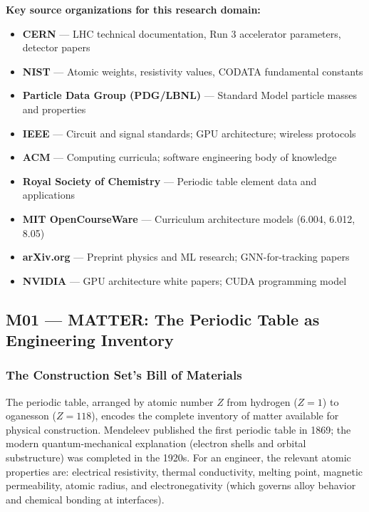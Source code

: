 \documentclass[11pt,letterpaper]{article}
\begin{document}
\textbf{Key source organizations for this research domain:}
\begin{itemize}[leftmargin=*]
  \item \textbf{CERN} --- LHC technical documentation, Run 3 accelerator parameters, detector papers
  \item \textbf{NIST} --- Atomic weights, resistivity values, CODATA fundamental constants
  \item \textbf{Particle Data Group (PDG/LBNL)} --- Standard Model particle masses and properties
  \item \textbf{IEEE} --- Circuit and signal standards; GPU architecture; wireless protocols
  \item \textbf{ACM} --- Computing curricula; software engineering body of knowledge
  \item \textbf{Royal Society of Chemistry} --- Periodic table element data and applications
  \item \textbf{MIT OpenCourseWare} --- Curriculum architecture models (6.004, 6.012, 8.05)
  \item \textbf{arXiv.org} --- Preprint physics and ML research; GNN-for-tracking papers
  \item \textbf{NVIDIA} --- GPU architecture white papers; CUDA programming model
\end{itemize}

\subsection{M01 --- MATTER: The Periodic Table as Engineering Inventory}

\subsubsection{The Construction Set's Bill of Materials}

The periodic table, arranged by atomic number $Z$ from hydrogen ($Z=1$) to oganesson ($Z=118$),
encodes the complete inventory of matter available for physical construction. Mendeleev published
the first periodic table in 1869; the modern quantum-mechanical explanation (electron shells and
orbital substructure) was completed in the 1920s. For an engineer, the relevant atomic properties
are: electrical resistivity, thermal conductivity, melting point, magnetic permeability, atomic
radius, and electronegativity (which governs alloy behavior and chemical bonding at interfaces).
\end{document}
